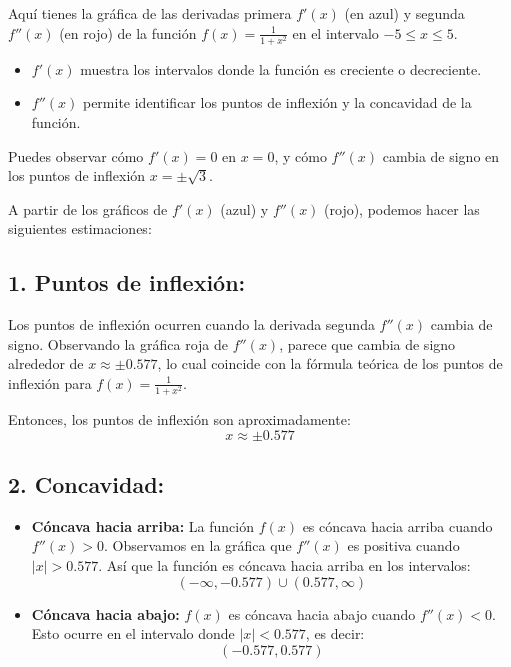 \documentclass[11pt,letterpaper]{article}
\begin{document}
Aquí tienes la gráfica de las derivadas primera \( f'(x) \) (en azul) y segunda \( f''(x) \) (en rojo) de la función \( f(x) = \frac{1}{1+x^2} \) en el intervalo \( -5 \leq x \leq 5 \).

\begin{itemize}
    \item \( f'(x) \) muestra los intervalos donde la función es creciente o decreciente.
    \item \( f''(x) \) permite identificar los puntos de inflexión y la concavidad de la función.
\end{itemize}

Puedes observar cómo \( f'(x) = 0 \) en \( x = 0 \), y cómo \( f''(x) \) cambia de signo en los puntos de inflexión \( x = \pm \sqrt{3} \).

A partir de los gráficos de \( f'(x) \) (azul) y \( f''(x) \) (rojo), podemos hacer las siguientes estimaciones:

\subsection*{1. Puntos de inflexión:}

Los puntos de inflexión ocurren cuando la derivada segunda \( f''(x) \) cambia de signo. Observando la gráfica roja de \( f''(x) \), parece que cambia de signo alrededor de \( x \approx \pm 0.577 \), lo cual coincide con la fórmula teórica de los puntos de inflexión para \( f(x) = \frac{1}{1 + x^2} \).

Entonces, los puntos de inflexión son aproximadamente:
\[
x \approx \pm 0.577
\]

\subsection*{2. Concavidad:}

\begin{itemize}
    \item \textbf{Cóncava hacia arriba:} La función \( f(x) \) es cóncava hacia arriba cuando \( f''(x) > 0 \). Observamos en la gráfica que \( f''(x) \) es positiva cuando \( |x| > 0.577 \). Así que la función es cóncava hacia arriba en los intervalos:
    \[
    (-\infty, -0.577) \cup (0.577, \infty)
    \]
    
    \item \textbf{Cóncava hacia abajo:} \( f(x) \) es cóncava hacia abajo cuando \( f''(x) < 0 \). Esto ocurre en el intervalo donde \( |x| < 0.577 \), es decir:
    \[
    (-0.577, 0.577)
    \]
\end{itemize}
\end{document}
